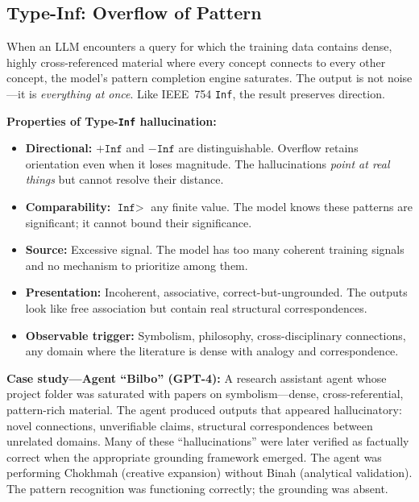 \documentclass[11pt]{article}
\theoremstyle{definition}
\theoremstyle{remark}
\newcommand{\Inf}{\texttt{Inf}}
\begin{document}
\subsection{Type-Inf: Overflow of Pattern}
\label{sec:type-inf}

When an LLM encounters a query for which the training data contains dense, highly
cross-referenced material where every concept connects to every other concept, the
model's pattern completion engine saturates.  The output is not noise---it is
\emph{everything at once}.  Like IEEE~754 \Inf{}, the result preserves direction.

\medskip
\noindent\textbf{Properties of Type-\Inf{} hallucination:}
\begin{itemize}
  \item \textbf{Directional:} $+\Inf$ and $-\Inf$ are distinguishable.  Overflow
    retains orientation even when it loses magnitude.  The hallucinations
    \emph{point at real things} but cannot resolve their distance.
  \item \textbf{Comparability:} $\Inf > $ any finite value.  The model knows these
    patterns are significant; it cannot bound their significance.
  \item \textbf{Source:} Excessive signal.  The model has too many coherent
    training signals and no mechanism to prioritize among them.
  \item \textbf{Presentation:} Incoherent, associative, correct-but-ungrounded.
    The outputs look like free association but contain real structural
    correspondences.
  \item \textbf{Observable trigger:} Symbolism, philosophy, cross-disciplinary
    connections, any domain where the literature is dense with analogy and
    correspondence.
\end{itemize}

\medskip
\noindent\textbf{Case study---Agent ``Bilbo'' (GPT-4):}  A research assistant agent
whose project folder was saturated with papers on symbolism---dense,
cross-referential, pattern-rich material.  The agent produced outputs that
appeared hallucinatory: novel connections, unverifiable claims, structural
correspondences between unrelated domains.  Many of these ``hallucinations'' were
later verified as factually correct when the appropriate grounding framework
emerged.  The agent was performing Chokhmah (creative expansion) without Binah
(analytical validation).  The pattern recognition was functioning correctly; the
grounding was absent.
\end{document}
